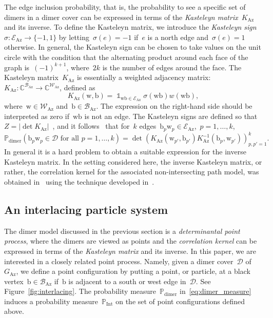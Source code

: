 \documentclass[11pt]{article}
\theoremstyle{plain}
\theoremstyle{definition}
\numberwithin{equation}{section}
\newcommand{\CC}{\mathbb{C}}
\newcommand{\PP}{\mathbb{P}}
\DeclareMathOperator{\one}{\mathds{1}}
\begin{document}
The edge inclusion probability, that is, the probability to see a specific set of dimers in a dimer cover can be expressed in terms of the \emph{Kasteleyn matrix}~$K_{\operatorname{Az}}$ and its inverse. To define the Kasteleyn matrix, we introduce the \emph{Kasteleyn sign}~$\sigma:\mathcal E_\text{Az}\to \{-1,1\}$ by letting~$\sigma(e)=-1$ if~$e$ is a north edge and~$\sigma(e)=1$ otherwise. In general, the Kasteleyn sign can be chosen to take values on the unit circle with the condition that the alternating product around each face of the graph is~$(-1)^{k+1}$, where~$2k$ is the number of edges around the face. The Kasteleyn matrix~$K_{\operatorname{Az}}$ is essentially a weighted adjacency matrix:~$K_{\operatorname{Az}}:\CC^{\mathcal B_\text{Az}}\to \CC^{\mathcal W_\text{Az}}$, defined as
\begin{equation}\label{eq:kasteleyn}
K_{\operatorname{Az}}(\mathrm w,\mathrm b)=\one_{\mathrm w\mathrm b\in \mathcal E_{\text{Az}}}\sigma(\mathrm w\mathrm b)w(\mathrm w\mathrm b),
\end{equation}
where~$\mathrm w\in \mathcal W_\text{Az}$ and~$\mathrm b\in \mathcal B_\text{Az}$. The expression on the right-hand side should be interpreted as zero if~$\mathrm w\mathrm b$ is not an edge. The Kasteleyn signs are defined so that~$Z=|\det K_{\text{Az}}|$~\cite{Kas61, TF61}, and it follows~\cite{Ken97} that for~$k$ edges~$\mathrm b_p\mathrm w_p\in \mathcal E_\text{Az}$,~$p=1,\dots,k$,
\begin{equation}\label{eq:kenyons_formula}
\PP_{\operatorname{dimer}}\left(\mathrm b_p \mathrm w_p\in \mathcal D\text{ for all }p=1,\dots,k\right)=\det\left(K_\text{Az}(\mathrm w_{p'},\mathrm b_{p'})K_\text{Az}^{-1}(\mathrm b_p,\mathrm w_{p'})\right)_{p,p'=1}^k.
\end{equation}
In general it is a hard problem to obtain a suitable expression for the inverse Kasteleyn matrix. In the setting considered here, the inverse Kasteleyn matrix, or rather, the correlation kernel for the associated non-intersecting path model, was obtained in~\cite{Ber21} using the technique developed in~\cite{BD19}.


\subsection{An interlacing particle system}\label{sec:interlacing_particles}

The dimer model discussed in the previous section is a \emph{determinantal point process}, where the dimers are viewed as points and the \emph{correlation kernel} can be expressed in terms of the \emph{Kasteleyn matrix} and its inverse. In this paper, we are interested in a closely related point process. Namely, given a dimer cover~$\mathcal D$ of~$G_\text{Az}$, we define a point configuration by putting a point, or particle, at a black vertex~$\mathrm b\in \mathcal B_\text{Az}$ if~$\mathrm b$ is adjacent to a south or west edge in~$\mathcal D$. See Figure~\ref{fig:interlacing}. The probability measure~$\PP_{\operatorname{dimer}}$ in~\eqref{eq:dimer_measure} induces a probability measure~$\PP_{\operatorname{Int}}$ on the set of point configurations defined above.
\end{document}
